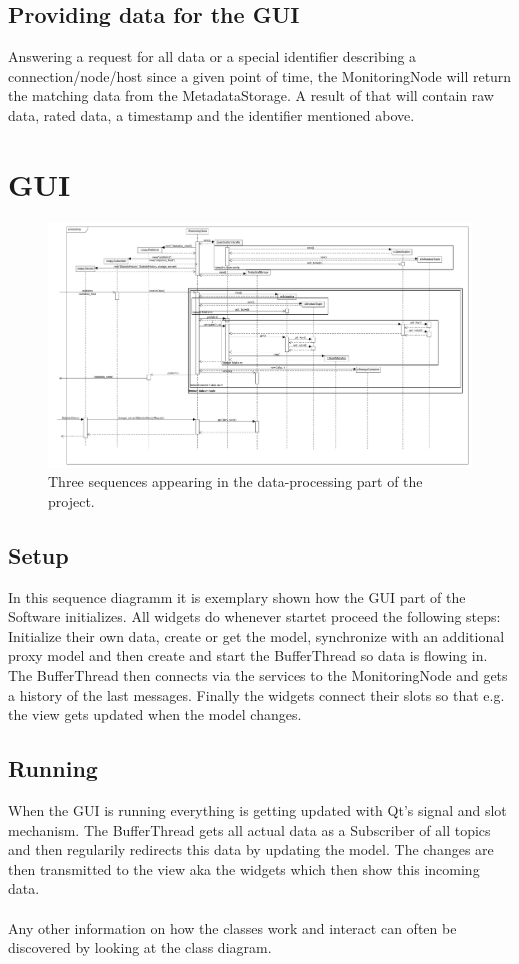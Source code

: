\subsection*{Providing data for the GUI}
Answering a request for all data or a special identifier describing a connection/node/host since a given point of time, the MonitoringNode will return the matching data from the MetadataStorage.
A result of that will contain raw data, rated data, a timestamp and the identifier mentioned above.

\section{GUI}
\begin{figure}[!ht]
	\begin{center}
		\includegraphics[width=1.0\linewidth]{./diagram_pictures/processing_seq.pdf}
		\caption{Three sequences appearing in the data-processing part of the project.}
	\end{center}
\end{figure}
\subsection{Setup}
In this sequence diagramm it is exemplary shown how the GUI part of the Software initializes.
All widgets do whenever startet proceed the following steps: Initialize their own data, create or get the model, synchronize with an additional proxy model and then create and start the BufferThread so data is flowing in. The BufferThread then connects via the services to the MonitoringNode and gets a history of the last messages.
Finally the widgets connect their slots so that e.g. the view gets updated when the model changes.
\subsection{Running}
When the GUI is running everything is getting updated with Qt's signal and slot mechanism. The BufferThread gets all actual data as a Subscriber of all topics and then regularily redirects this data by updating the model. The changes are then transmitted to the view aka the widgets which then show this incoming data.
\\
\\Any other information on how the classes work and interact can often be discovered by looking at the class diagram.